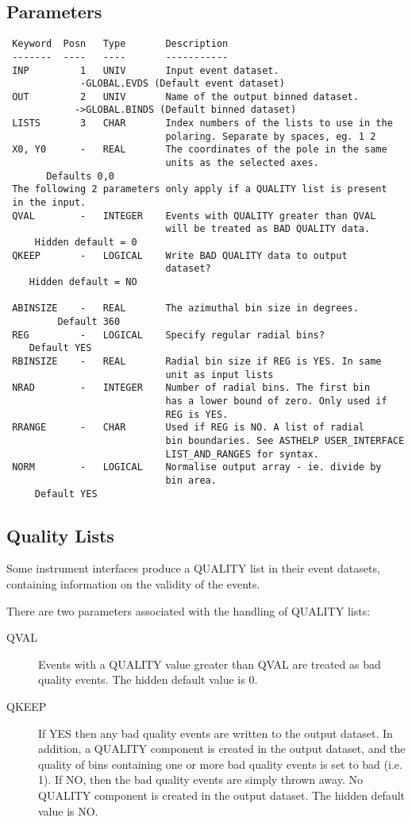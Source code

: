 \documentclass{book}
\renewcommand{\_}{{\tt\char'137}}     %
\begin{document}
\subsection{Parameters}
\begin{verbatim}
 Keyword  Posn   Type       Description
 -------  ----   ----       -----------
 INP         1   UNIV       Input event dataset.
             -GLOBAL.EVDS (Default event dataset)
 OUT         2   UNIV       Name of the output binned dataset.
            ->GLOBAL.BINDS (Default binned dataset)
 LISTS       3   CHAR       Index numbers of the lists to use in the
                            polaring. Separate by spaces, eg. 1 2
 X0, Y0      -   REAL       The coordinates of the pole in the same
                            units as the selected axes.
       Defaults 0,0
 The following 2 parameters only apply if a QUALITY list is present
 in the input.
 QVAL        -   INTEGER    Events with QUALITY greater than QVAL
                            will be treated as BAD QUALITY data.
     Hidden default = 0
 QKEEP       -   LOGICAL    Write BAD QUALITY data to output
                            dataset?
    Hidden default = NO

 ABINSIZE    -   REAL       The azimuthal bin size in degrees.
         Default 360
 REG         -   LOGICAL    Specify regular radial bins?
    Default YES
 RBINSIZE    -   REAL       Radial bin size if REG is YES. In same
                            unit as input lists
 NRAD        -   INTEGER    Number of radial bins. The first bin
                            has a lower bound of zero. Only used if
                            REG is YES.
 RRANGE      -   CHAR       Used if REG is NO. A list of radial
                            bin boundaries. See ASTHELP USER_INTERFACE
                            LIST_AND_RANGES for syntax.
 NORM        -   LOGICAL    Normalise output array - ie. divide by
                            bin area.
     Default YES

\end{verbatim}\subsection{Quality Lists}
Some instrument interfaces produce a QUALITY list in their event
datasets, containing information on the validity of the events.

There are two parameters associated with the handling of QUALITY
lists:


\begin{description}
\item[QVAL]
Events with a QUALITY value greater than QVAL are
treated as bad quality events. The hidden default
value is 0.
\item[QKEEP]
If YES then any bad quality events are written to the
output dataset. In addition, a QUALITY component is
created in the output dataset, and the quality of bins
containing one or more bad quality events is set to
bad (i.e. 1).
If NO, then the bad quality events are simply
thrown away. No QUALITY component is created in the
output dataset.
The hidden default value is NO.
\end{description}
\end{document}
